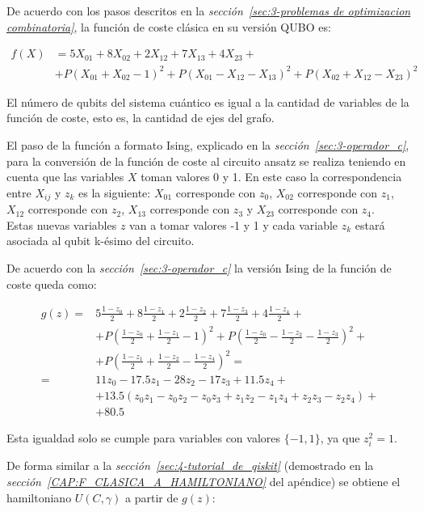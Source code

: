 De acuerdo con los pasos descritos en la \textit{sección~\ref{sec:3-problemas de optimizacion combinatoria}}, la función de coste clásica en su versión QUBO es:

\begin{align}
  f(X) &= 5X_{01} + 8X_{02} + 2X_{12} + 7X_{13} + 4X_{23} + \nonumber \\
       &+ P{(X_{01} + X_{02} - 1)}^2 + P{(X_{01} - X_{12} - X_{13})}^2 + P{(X_{02} + X_{12} - X_{23})}^2
\end{align}

El número de qubits del sistema cuántico es igual a la cantidad de variables de la función de coste, esto es, la cantidad de ejes del grafo.

El paso de la función a formato Ising, explicado en la \textit{sección~\ref{sec:3-operador_c}}, para la conversión de la función de coste al circuito ansatz se realiza teniendo en cuenta que las variables $X$ toman valores 0 y 1.
En este caso la correspondencia entre $X_{ij}$ y $z_k$ es la siguiente:
$X_{01}$ corresponde con $z_0$,
$X_{02}$ corresponde con $z_1$,
$X_{12}$ corresponde con $z_2$,
$X_{13}$ corresponde con $z_3$ y
$X_{23}$ corresponde con $z_4$.
\\
Estas nuevas variables $z$ van a tomar valores -1 y 1 y cada variable $z_k$ estará asociada al qubit k-ésimo del circuito. 

De acuerdo con la \textit{sección~\ref{sec:3-operador_c}} la versión Ising de la función de coste queda como:

\begin{align}
  g(z) = &5\frac{1-z_0}{2} + 8\frac{1-z_1}{2} + 2\frac{1-z_2}{2} + 7\frac{1-z_3}{2} + 4\frac{1-z_4}{2} + \nonumber \\
         &+ P{(\frac{1-z_0}{2} + \frac{1-z_1}{2} - 1)}^2 + P{(\frac{1-z_0}{2} - \frac{1-z_2}{2} - \frac{1-z_3}{2})}^2 + \nonumber \\
         &+ P{(\frac{1-z_1}{2} + \frac{1-z_2}{2} - \frac{1-z_4}{2})}^2 = \nonumber \\
  = & 11z_0 - 17.5z_1 - 28z_2 - 17z_3 + 11.5z_4 + \nonumber \\
         &+ 13.5(z_0z_1 - z_0z_2 - z_0z_3 + z_1z_2 - z_1z_4 + z_2z_3 - z_2z_4) + \nonumber \\
         &+ 80.5
\end{align}
\par
Esta igualdad solo se cumple para variables con valores \(\{-1, 1\}\), ya que \(z_i^2 = 1\).

De forma similar a la \textit{sección~\ref{sec:4-tutorial_de_qiskit}} (demostrado en la \textit{sección~\ref{CAP:F_CLASICA_A_HAMILTONIANO}} del apéndice) se obtiene el hamiltoniano $U(C, \gamma)$ a partir de $g(z)$:

